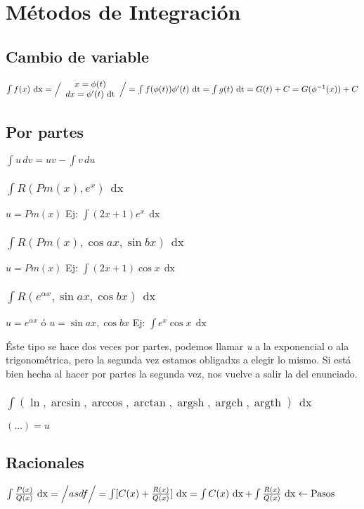 \documentclass[a4paper,11pt]{article}
\DeclareMathOperator{\xder}{\, \mathrm{d}x}
\DeclareMathOperator{\tder}{\, \mathrm{d}t}
\DeclareMathOperator{\argsh}{argsh}
\DeclareMathOperator{\argch}{argch}
\DeclareMathOperator{\argth}{argth}
\begin{document}
	\section{Métodos de Integración}
		\subsection{Cambio de variable}
			$ \int f(x) \xder = \Big{/}
				\begin{array}{c}
					x = \phi (t) \\
					dx = \phi'(t) \tder
				\end{array}
				\Big{/}
				= \int f(\phi(t)) \phi' (t) \tder =
				\int g(t) \tder = G (t) + C = G (\phi^{-1} (x)) + C
			$
		\subsection{Por partes}
			$ \int u \, dv = uv - \int v \, du $

			\subsubsection{$ \int R (Pm(x), e^x) \xder$}
				$ u = Pm(x) $ \quad 
				Ej: $ \int (2x + 1) e^x \xder $
			\subsubsection{$ \int R (Pm(x), \cos ax, \sin bx) \xder $}
				$ u = Pm(x) $ \quad
				Ej: $ \int (2x + 1) \cos x \xder $
			\subsubsection{$ \int R (e^{\alpha x}, \sin ax, \cos bx) \xder $}
				$ u = e^{\alpha x} $ ó $ u = \sin ax, \cos bx $ \quad
				Ej: $ \int e^x \cos x \xder $

				Éste tipo se hace dos veces por partes, podemos llamar 
				\textit{u} a la exponencial o ala trigonométrica, pero la
				segunda vez estamos obligadxs a elegir lo mismo. Si está bien
				hecha al hacer por partes la segunda vez, nos vuelve a salir
				la del enunciado.
			\subsubsection{$ \int (\ln, \arcsin, \arccos, \arctan, \argsh, \argch, \argth ) \xder $}
				$ ( \dots ) = u $
		\subsection{Racionales}
			$ \int \frac{P(x)}{Q(x)} \xder =
				\Big{/}
					asdf
				\Big{/}
				= \int [ C(x) + \frac{R(x)}{Q(x)} ] \xder =
				\int C(x) \xder + \int \frac{R(x)}{Q(x)} \xder \leftarrow \text{Pasos} $
\end{document}
